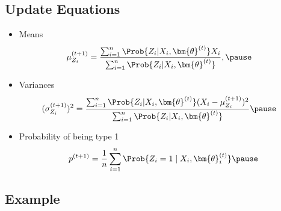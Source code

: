 \begin{slide}
\section[-2]{Update Equations}

\begin{PauseHighLight}
  \begin{itemize}
  \item Means
    \begin{align*}
      \mu_{Z_i}^{(t+1)}
      &= \frac{ \sum_{i=1}^n \Prob{Z_i|X_i,\bm{\theta}^{(t)}} X_i}
        {\sum_{i=1}^n \Prob{Z_i|X_i,\bm{\theta}^{(t)}}},\pause
    \end{align*}
\item Variances
  \begin{align*}
    (\sigma_{Z_i}^{(t+1)})^2
      &= \frac{ \sum_{i=1}^n \Prob{Z_i|X_i,\bm{\theta}^{(t)}}
        (X_i-\mu^{(t+1)}_{Z_i})^2}
        {\sum_{i=1}^n \Prob{Z_i|X_i,\bm{\theta}^{(t)}}}\pause
  \end{align*}
  \item Probability of being type 1
    \begin{align*}
      p^{(t+1)} = \frac{1}{n} \sum_{i=1}^n \Prob{Z_i=1 \mid X_i, \bm{\theta}^{(t)}_i}\pause
    \end{align*}
  \end{itemize}
\end{PauseHighLight}
  
\end{slide}



\begin{slide}
\section{Example}
\pause
\pb{}
\begin{center}
  \pause
\end{center}
\end{slide}


